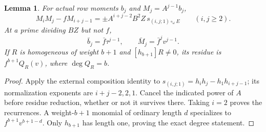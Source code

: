 \documentclass[11pt,a4paper]{amsart}
\numberwithin{equation}{section}
\theoremstyle{plain}
\newtheorem{lemma}[theorem]{Lemma}
\theoremstyle{definition}
\begin{document}
\begin{lemma}\label{lem:row-collapse}
For actual row moments \(b_j\) and \(M_j=A^{j-1}b_j\),
\[
 M_iM_j-fM_{i+j-1}=\pm A^{i+j-2}B^2Z\,s_{(i,j;1)\circ_\omega E}
 \qquad(i,j\ge2).
\]
At a prime dividing \(BZ\) but not \(f\),
\[
 \bar b_j=\bar f\tau^{j-1},\qquad
 \bar M_j=\bar f^jv^{j-1}.
\]
If \(R\) is homogeneous of weight \(b+1\) and \([h_{b+1}]R\ne0\), its residue is \(f^{b+1}Q_R(v)\), where \(\deg Q_R=b\).
\end{lemma}
\begin{proof}
Apply the external composition identity to \(s_{(i,j;1)}=h_ih_j-h_1h_{i+j-1}\); its normalization exponents are \(i+j-2,2,1\).  Cancel the indicated power of \(A\) before residue reduction, whether or not it survives there.  Taking \(i=2\) proves the recurrences.  A weight-\(b+1\) monomial of ordinary length \(d\) specializes to \(f^{b+1}v^{b+1-d}\).  Only \(h_{b+1}\) has length one, proving the exact degree statement.
\end{proof}
\end{document}
